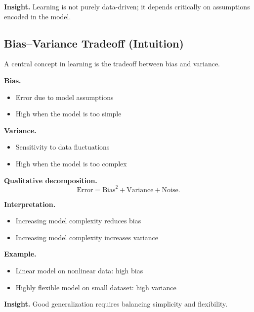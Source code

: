 \medskip

\noindent
\textbf{Insight.}  
Learning is not purely data-driven; it depends critically on assumptions encoded in the model.

\subsection{Bias--Variance Tradeoff (Intuition)}

A central concept in learning is the tradeoff between bias and variance.

\medskip

\noindent
\textbf{Bias.}
\begin{itemize}
    \item Error due to model assumptions
    \item High when the model is too simple
\end{itemize}

\medskip

\noindent
\textbf{Variance.}
\begin{itemize}
    \item Sensitivity to data fluctuations
    \item High when the model is too complex
\end{itemize}

\medskip

\noindent
\textbf{Qualitative decomposition.}
\[
\text{Error} = \text{Bias}^2 + \text{Variance} + \text{Noise}.
\]

\medskip

\noindent
\textbf{Interpretation.}
\begin{itemize}
    \item Increasing model complexity reduces bias
    \item Increasing model complexity increases variance
\end{itemize}

\medskip

\noindent
\textbf{Example.}
\begin{itemize}
    \item Linear model on nonlinear data: high bias
    \item Highly flexible model on small dataset: high variance
\end{itemize}

\medskip

\noindent
\textbf{Insight.}  
Good generalization requires balancing simplicity and flexibility.

